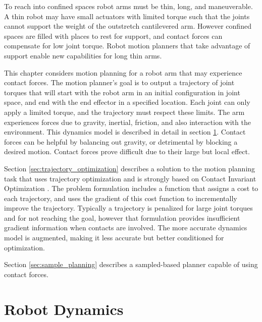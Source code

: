 \documentclass[../thesis.tex]{subfiles}
\begin{document}
To reach into confined spaces robot arms must be thin, long, and maneuverable.
A thin robot may have small actuators with limited torque such that the joints cannot support the weight of the outstretch cantilevered arm.
However confined spaces are filled with places to rest for support, and contact forces can compensate for low joint torque. 
Robot motion planners that take advantage of support enable new capabilities for long thin arms.

This chapter considers motion planning for a robot arm that may experience contact forces.
The motion planner's goal is to output a trajectory of joint torques that will start with the robot arm in an initial configuration in joint space, and end with the end effector in a specified location.
Each joint can only apply a limited torque, and the trajectory must respect these limits.
The arm experiences forces due to gravity, inertial, friction, and also interaction with the environment.
This dynamics model is described in detail in section \ref{sec:robot_dynamics}.
Contact forces can be helpful by balancing out gravity, or detrimental by blocking a desired motion.
Contact forces prove difficult due to their large but local effect.


Section \ref{sec:trajectory_optimization} describes a solution to the motion planning task that uses trajectory optimization and is strongly based on Contact Invariant Optimization \cite{Mordatch2012}.
The problem formulation includes a function that assigns a cost to each trajectory, and uses the gradient of this cost function to incrementally improve the trajectory.
Typically a trajectory is penalized for large joint torques and for not reaching the goal, however that formulation provides insufficient gradient information when contacts are involved.
The more accurate dynamics model is augmented, making it less accurate but better conditioned for optimization.

Section \ref{sec:sample_planning} describes a sampled-based planner capable of using contact forces.







\section{Robot Dynamics} \label{sec:robot_dynamics}
\end{document}
